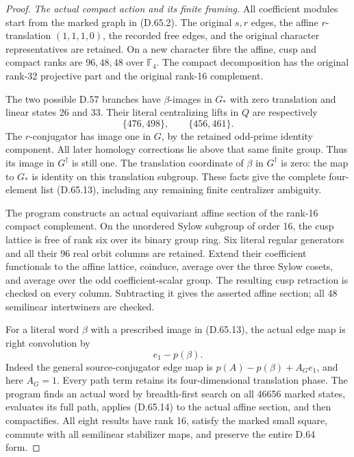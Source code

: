 \begin{proof}
\emph{The actual compact action and its finite framing.}
All coefficient modules start from the marked graph in (D.65.2).
The original \(s,r\) edges, the affine \(r\)-translation
\((1,1,1,0)\), the recorded free edges, and the original character
representatives are retained. On a new character fibre the affine,
cusp and compact ranks are \(96,48,48\) over \(\mathbb F_4\).
The compact decomposition has the original rank-32 projective part
and the original rank-16 complement.

The two possible D.57 branches have \(\beta\)-images in \(G_*\)
with zero translation and linear states 26 and 33. Their literal
centralizing lifts in \(Q\) are respectively
\[
             \{476,498\},\qquad\{456,461\}.
 \tag{D.65.13}
\]
The \(r\)-conjugator has image one in \(G\), by the retained odd-prime
identity component. All later homology corrections lie above that
same finite group. Thus its image in \(G^\dagger\) is still one.
The translation coordinate of \(\beta\) in \(G^\dagger\) is zero:
the map to \(G_*\) is identity on this translation subgroup. These
facts give the complete four-element list (D.65.13), including any
remaining finite centralizer ambiguity.

The program  constructs an actual
equivariant affine section of the rank-16 compact complement. On
the unordered Sylow subgroup of order 16, the cusp lattice is free
of rank six over its binary group ring. Six literal regular
generators and all their 96 real orbit columns are retained. Extend
their coefficient functionals to the affine lattice, coinduce,
average over the three Sylow cosets, and average over the odd
coefficient-scalar group. The resulting cusp retraction is checked
on every column. Subtracting it gives the asserted affine section;
all 48 semilinear intertwiners are checked.

For a literal word \(\beta\) with a prescribed image in (D.65.13),
the actual edge map is right convolution by
\[
                           e_1-p(\beta).
 \tag{D.65.14}
\]
Indeed the general source-conjugator edge map is
\(p(A)-p(\beta)+A_Ge_1\), and here \(A_G=1\).
Every path term retains its four-dimensional translation phase.
The program finds an actual word by breadth-first search on all
46656 marked states, evaluates its full path, applies (D.65.14) to
the actual affine section, and then compactifies. All eight results
have rank 16, satisfy the marked small square, commute with all
semilinear stabilizer maps, and preserve the entire D.64 form.


\end{proof}
